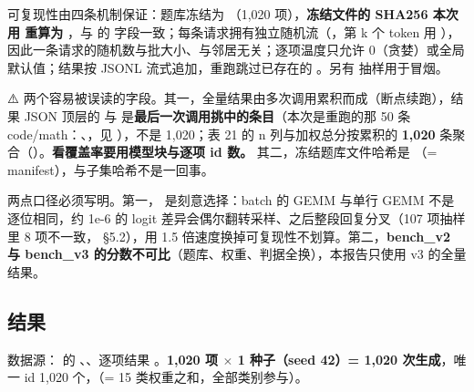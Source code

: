 \documentclass[11pt,openany]{ctexart}
\begin{document}
可复现性由四条机制保证：题库冻结为 （1,020 项），\textbf{冻结文件的 SHA256 本次用  重算为 }，与  的  字段一致；每条请求拥有独立随机流（，第 k 个 token 用 ），因此一条请求的随机数与批大小、与邻居无关；逐项温度只允许 0（贪婪）或全局默认值；结果按 JSONL 流式追加，重跑跳过已存在的 。另有  抽样用于冒烟。

\begin{notebox}
⚠️ 两个容易被误读的字段。其一，全量结果由多次调用累积而成（断点续跑），结果 JSON 顶层的  与  是\textbf{最后一次调用挑中的条目}（本次是重跑的那 50 条 code/math：、，见 ），不是 1,020；表 21 的 n 列与加权总分按累积的 \textbf{1,020} 条聚合（）。\textbf{看覆盖率要用模型块与逐项 id 数。} 其二，冻结题库文件哈希是 （= manifest），与子集哈希不是一回事。
\end{notebox}

两点口径必须写明。第一， 是刻意选择：batch 的 GEMM 与单行 GEMM 不是逐位相同，约 1e-6 的 logit 差异会偶尔翻转采样、之后整段回复分叉（107 项抽样里 8 项不一致， §5.2），用 1.5 倍速度换掉可复现性不划算。第二，\textbf{bench\allowbreak{}\_v2 与 bench\allowbreak{}\_v3 的分数不可比}（题库、权重、判据全换），本报告只使用 v3 的全量结果。

\subsection{结果}

数据源： 的 、、逐项结果 。\textbf{1,020 项 $\times$ 1 种子（seed 42）= 1,020 次生成}，唯一 id 1,020 个，（= 15 类权重之和，全部类别参与）。
\end{document}
